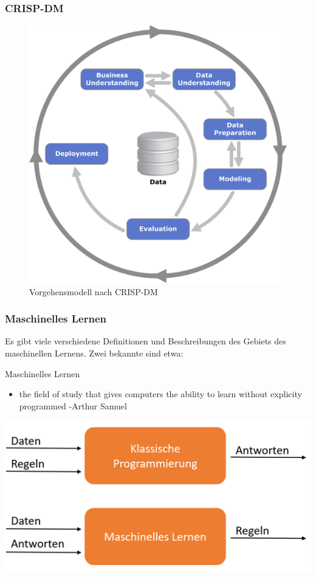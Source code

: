 \begin{frame}
\frametitle{CRISP-DM}
\begin{figure}[hbtp]
\centering
\includegraphics[scale=0.4]{images/CRISP-DM_Process_Diagram.png}
\caption{Vorgehensmodell nach CRISP-DM}
\end{figure}

\end{frame}
\begin{frame}
\frametitle{Maschinelles Lernen}
Es gibt viele verschiedene Definitionen und Beschreibungen des Gebiets des maschinellen Lernens. Zwei bekannte sind etwa:
\begin{block}{Maschinelles Lernen}
\begin{itemize}
\item {} the field of study that gives computers the ability to learn without explicity programmed\grqq{} -Arthur Samuel
\end{itemize}
\end{block}
\end{frame}
\begin{frame}
\centering
\includegraphics[scale=0.6]{images/MLparadigma.PNG} 
\end{frame}
